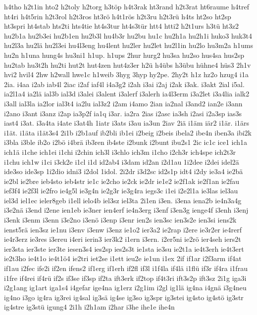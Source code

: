 {h4tho
h2t1in
hto2
h2toly
h2torg
h3töp
h4t3rak
ht3rand
h2t3rat
ht6raume
h4tref
ht4ri
h4t5rin
h2t3rol
h2t3ros
ht3rö
h4t1rös
h2t3ru
h2t3rü
h4ts
ht2so
ht2sp
ht3spri
ht4stab
hts2ti
hts4tie
ht4s3tur
ht4s3tür
htt4
htti2
h2t1urs
h3tü
ht3z2
hu2b1a
hu2b3ei
hu2b1en
hu2b3l
hu4b3r
hu2bu
hu1c
hu2h1a
hu2h1i
huko3
huk3t4
hu2l3a
hu2lä
hu2l3ei
hu4l3eng
hu4lent
hu2ler
hu2let
hu2l1in
hu2lo
hu3m2a
h1ums
hu2n
h1una
hung4s
hu3ni1
h1up.
h1ups
2hur
hurg2
hu3sa
hu2so
hus4sa
hus2sp
hu2tab
hu3t2h
hu2ti
hut2t
hut4zen
hut4z3er
h2ü
h4übs
h3übu
hühne4
hüs3
2h1v
hvi2
hvil4
2hw
h2wall
hwe1c
h1weib
3hyg
3hyp
hy2pe.
2hy2t
h1z
hz2o
hzug4
i1a
2ia.
i4aa
i2ab
iab4l
2iac
i2af
iaf4l
i4a3g2
i2ah
i3ai
i2aj
i2ak
i3ak.
i3akt
2ial
i5al.
ia2l1a4
ia2lä
ial3b
ial3d
i3alei
i3alent
i3alerf
i3alerh
ia4l3erm
i3a2let
i3a4lia
ialk2
i3all
ial3la
ia2lor
ial3t4
ia2lu
ial3z2
i2am
i4amo
2ian
ia2nal
i3and2
ian2e
i3ann
i2ano
i3ant
i3anz
i2ap
ia3p2f
ia1q
i3ar.
ia2ra
2ias
i2asc
ia3sh
i2asi
i2a3sp
ias3s
iast4
i3at.
i3a4ta
i4ate
i3at4h
1iatr
i3ats
i3au
ia3un
2iav
2iä
i1äm
iär2
i1är.
i1ärs
i1ät.
i1äta
i1ät3s4
2i1b
i2b1auf
ib2bli
ib1ei
i2beig
i2beis
ibela2
ibe4n
iben3a
ibi2k
i3bla
i3ble
ib2o
i2bö
i4brä
ib3ren
ib4ste
i2bunk
i2bunt
ibu2s1
2ic
ic1c
ice1
ich1a
ich1ä
i1che
ich1ei
i1chi
i2chin
ich3l
i3chlo
ich3m
i1cho
i2ch3r
ich4spe
ich2t3r
i1chu
ich1w
i1ci
i3ck2e
i1cl
i1d
id2ab4
i3dam
id2an
i2d1au
1i2dee
i2dei
idel2ä
ide3so
ide3sp
1i2dio
idni3
i2dol
1idol.
2i2dr
i3d2sc
id2s1p
idt4
i2dy
ie3a4
ie2bä
ie2bl
ie2bre
ieb4sto
ieb4str
ie1c
ie2cho
ie2ck
ie2dr
ie1e2
ie2f1ak
ie2f1an
ie2fau
ief3f4
ie2f3l
ie2fro
ie4g5l
ie3g4n
ie2g3r
ie3g4ra
iegs3c
i1ei
i2e2l1a
ie3las
iel3au
iel3d
iel1ec
ieler8geb
i1ell
ielo4b
iel3sz
iel3ta
2i1en
i3en.
i3ena
iena2b
ie4n3a4g
i3e2nä
i3end
i2ene
ien1eb
ie3ner
ien4erf
ie4n3erg
i3enf
i3en3g
ienge4f
i3enh
i3enj
i3enk
i3enm
i3enn
i3e2no
i3enö
i3enp
i3enr
ien2s
ien3sc
ien3s2e
ien3si
iens2k
ienst5rä
ien3sz
ie1nu
i3env
i3enw
i3enz
ie1o2
ier3a2
ie2rap
i2ere
ie3r2er
ie4rerf
ie4r3erz
ie3res
i3ereu
i4eri
ierin3
ier3k2
i1ern
i3ern.
i2er5ni
ie2rö
ier4seh
iers2t
ier3sta
ier3ste
ier3te
iesen3s4
ies2sp
ies2s3t
ie1sta
ie3su
ie2t1a
ie4t3erh
ie4t3ert
ie2t3ho
ie4t1o
ie4t1ö4
ie2tri
iet2se
i1ett
ieu2e
ie1un
i1ex
2if
if1ar
i2f3arm
if4at
if1au
i2fec
ife2i
if2en
ifens2
if1erg
if1erh
if2fl
if3l
i1f4la
if4lä
i1flü
if3r
if4ra
i1frau
i1fre
if4rei
if4rü
if2s
if3se
if3sp
if2ta
ift3erk
if2top
if4t3ri
ift3s2p
ift3sz
2i1g
iga3i
i2g1ang
ig1art
iga1s4
i4gefar
ige4na
ig1erz
i2g1im
i2gl
ig1lä
ig4na
i4gnä
i3g4neu
ig4no
i3go
ig4ra
ig3rei
ig4sal
ig3sä
ig4se
ig3so
ig3spr
ig3stei
ig4sto
ig4stö
ig3str
ig4stre
ig3stü
igung4
2i1h
i2h1am
i2har
i3he
ihe1e
ihe4n
}
